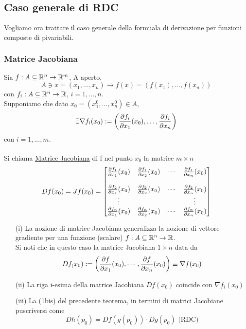 \subsection{Caso generale di RDC}
Vogliamo ora trattare il caso generale della formuala di derivazione per funzioni composte di pi\acu variabili.
\subsubsection{Matrice Jacobiana}
\begin{definition}
  Sia $f : A \subseteq \mathbb{R}^n \to \mathbb{R}^m$, A aperto,
  $$A \ni x = (x_1, ..., x_n)\rightarrow f(x) = \left(f(x_1),..., f(x_n)\right)$$
  con $f_i : A \subseteq \mathbb{R}^n \to \mathbb{R}$, $i = 1,...,n$.\\ Supponiamo che dato $x_0 = (x_1^0, ..., x_n^0) \in A$, 
  $$\exists \nabla f_i(x_0) := \left(\frac{\partial f_i}{\partial x_1}(x_0), \dots, \frac{\partial f_i}{\partial x_n}\right)$$
  con $i = 1,..., m$. \\\\
  Si chiama \underline{Matrice Jacobiana} di f nel punto $x_0$ la matrice $m\times n$
  $$D f(x_0) = J f(x_0) = \begin{bmatrix}
    \frac{\partial f_1}{\partial x_1}(x_0) & \frac{\partial f_1}{\partial x_2}(x_0) & \cdots & \frac{\partial f_1}{\partial x_n}(x_0) \\
    \\
    \frac{\partial f_2}{\partial x_1}(x_0) & \frac{\partial f_2}{\partial x_2}(x_0) & \cdots & \frac{\partial f_2}{\partial x_n}(x_0) \\ 
    \vdots &  & & \vdots \\
    \frac{\partial f_n}{\partial x_1}(x_0) & \frac{\partial f_n}{\partial x_2}(x_0) & \cdots & \frac{\partial f_n}{\partial x_n}(x_0) \\
  \end{bmatrix}$$
\end{definition}
\hfill \break
\begin{osservazione}
  \begin{enumerate}
    \item[(i)] La nozione di matrice Jacobiana generalizza la nozione di vettore gradiente per una 
                funzione (scalare) $f: A \subseteq \mathbb{R}^n \to \mathbb{R}$. \\
                Si noti che in questo caso la matrice Jacobiana $1 \times n$ \ace data da 
                $$D f_(x_0) := \left(\frac{\partial f}{\partial x_1}(x_0), \cdots, \frac{\partial f}{\partial x_n}(x_0)\right) \equiv \nabla f(x_0)$$ 
    \item[(ii)] La riga i-esima della matrice Jacobiana $D f(x_0)$ coincide con $\nabla f_i (x_0)$
    \item[(iii)] La (1bis) del precedente teorema, in termini di matrici Jacobiane pu\aco scriversi come 
                $$D h(p_0) = D f(g(p_0))\cdot D g(p_0) \text{ (RDC)}$$ 
  \end{enumerate}
\end{osservazione}
